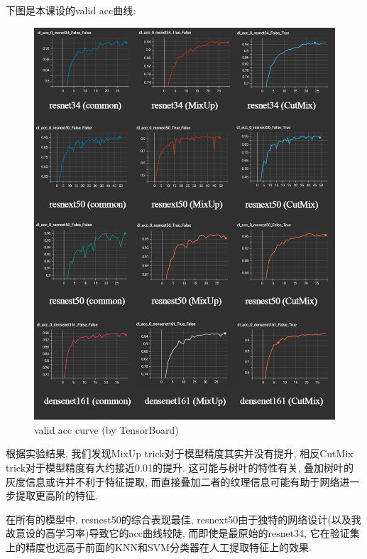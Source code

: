 \documentclass[lang=cn,12pt,a4paper]{elegantpaper}
\begin{document}
下图是本课设的valid acc曲线:

\begin{figure}[p]
    \centering
    \includegraphics[width=\textwidth]{lateximgs/5.png}
    \caption{valid acc curve (by TensorBoard)}
\end{figure}

\newpage
根据实验结果, 我们发现MixUp trick对于模型精度其实并没有提升, 相反CutMix trick对于模型精度有大约接近0.01的提升. 这可能与树叶的特性有关, 叠加树叶的灰度信息或许并不利于特征提取, 而直接叠加二者的纹理信息可能有助于网络进一步提取更高阶的特征.

在所有的模型中, resnest50的综合表现最佳, resnext50由于独特的网络设计(以及我故意设的高学习率)导致它的acc曲线较陡, 而即使是最原始的resnet34, 它在验证集上的精度也远高于前面的KNN和SVM分类器在人工提取特征上的效果. 

% 

\end{document}
